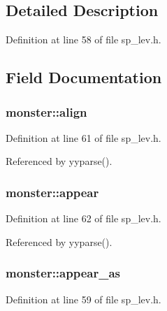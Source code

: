 \subsection{Detailed Description}


Definition at line 58 of file sp\+\_\+lev.\+h.



\subsection{Field Documentation}
\hypertarget{structmonster_a9572ac33b3cb42a51567421458c44ce6}{
\subsubsection[{align}]{ monster\+::align}}\label{structmonster_a9572ac33b3cb42a51567421458c44ce6}


Definition at line 61 of file sp\+\_\+lev.\+h.



Referenced by yyparse().

\hypertarget{structmonster_a464f427d9d531bc63c569d3033bf552f}{
\subsubsection[{appear}]{ monster\+::appear}}\label{structmonster_a464f427d9d531bc63c569d3033bf552f}


Definition at line 62 of file sp\+\_\+lev.\+h.



Referenced by yyparse().

\hypertarget{structmonster_a5aee88b4ae76f77c49e9909cb019cd13}{
\subsubsection[{appear\+\_\+as}]{ monster\+::appear\+\_\+as}}\label{structmonster_a5aee88b4ae76f77c49e9909cb019cd13}


Definition at line 59 of file sp\+\_\+lev.\+h.



